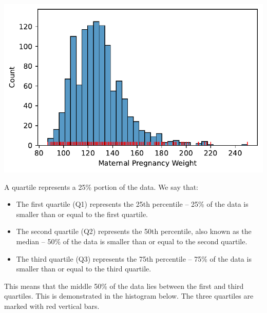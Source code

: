 \documentclass[
  letterpaper,
  DIV=11,
  numbers=noendperiod]{scrreprt}
\providecommand{\tightlist}{%
  \setlength{\itemsep}{0pt}\setlength{\parskip}{0pt}}\usepackage{longtable,booktabs,array}
\begin{document}
\includegraphics{visualization_1/visualization_1_files/figure-pdf/cell-9-output-1.pdf}

A quartile represents a 25\% portion of the data. We say that:

\begin{itemize}
\tightlist
\item
  The first quartile (Q1) represents the 25th percentile -- 25\% of the
  data is smaller than or equal to the first quartile.
\item
  The second quartile (Q2) represents the 50th percentile, also known as
  the median -- 50\% of the data is smaller than or equal to the second
  quartile.
\item
  The third quartile (Q3) represents the 75th percentile -- 75\% of the
  data is smaller than or equal to the third quartile.
\end{itemize}

This means that the middle 50\% of the data lies between the first and
third quartiles. This is demonstrated in the histogram below. The three
quartiles are marked with red vertical bars.
\end{document}
